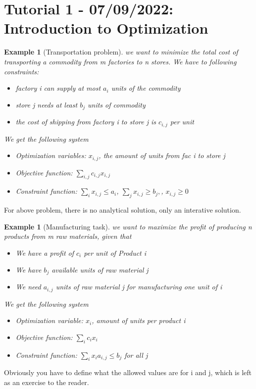 \documentclass[11pt]{article}
\newtheorem{example}[theorem]{Example}
\begin{document}
\section{Tutorial 1 - 07/09/2022: Introduction to Optimization}
\begin{example}[Transportation problem] we want to minimize the total cost of transporting a commodity from m factories to n stores. We have to following constraints: 
    \begin{itemize}
        \item factory i can supply at most $a_i$ units of the commodity
        \item store j needs at least $b_j$ units of commodity
        \item the cost of shipping from factory i to store j is $c_{i,j}$ per unit   
    \end{itemize}

    We get the following system

    \begin{itemize}
        \item Optimization variables: $x_{i,j}$, the amount of units from fac i to store j
        \item Objective function: $\sum_{i,j}c_{i,j}x_{i,j}$
        \item Constraint function: $\sum_{i}x_{i,j} \leq a_i$, $\sum_{j}x_{i,j} \geq b_j,$, $x_{i,j}\geq 0 $   
    \end{itemize}
\end{example}
For above problem, there is no analytical solution, only an interative solution.

\begin{example}[Manufacturing task] we want to maximize the profit of producing n products from m raw materials, given that
    \begin{itemize}
        \item We have a profit of $c_i$ per unit of Product i
        \item We have $b_j$ available units of raw material j
        \item We need $a_{i,j}$ units of raw material j for manufacturing one unit of i
    \end{itemize}
    We get the following system
    \begin{itemize}
        \item Optimization variable: $x_i$, amount of units per product i
        \item Objective function: $\sum_{i}c_i x_i$
        \item Constraint function: $\sum_i x_i a_{i,j} \leq b_j$ for all j   
    \end{itemize}
\end{example}
Obviously you have to define what the allowed values are for i and j, which is left as an exercise to the reader.
\end{document}
